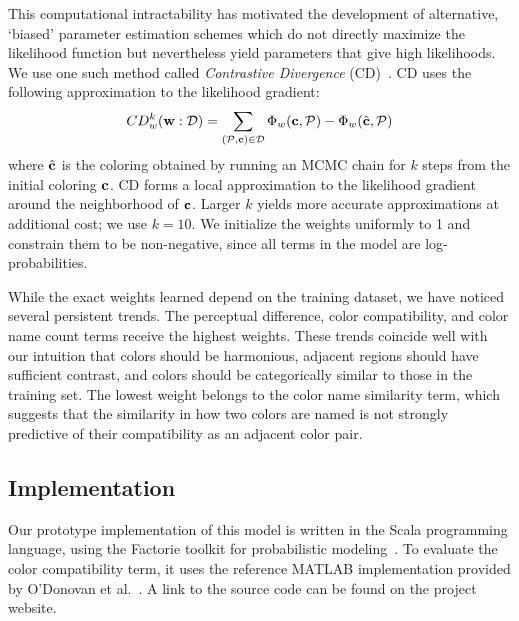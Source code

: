 This computational intractability has motivated the development of alternative, `biased' parameter estimation schemes which do not directly maximize the likelihood function but nevertheless yield parameters that give high likelihoods. We use one such method called \emph{Contrastive Divergence} (CD)~\cite{ContrastiveDivergence}. CD uses the following approximation to the likelihood gradient:
\begin{equation*}
CD^k_w(\mathbf{w} : \mathcal{D}) = 
	\sum_{(\mathcal{P}, \mathbf{c}) \in \mathcal{D}}
			\Phi_w(\mathbf{c}, \mathcal{P})
		 -\Phi_w(\hat{\mathbf{c}}, \mathcal{P})
\end{equation*}
where $\hat{\mathbf{c}}$ is the coloring obtained by running an MCMC chain for $k$ steps from the initial coloring $\mathbf{c}$. CD forms a local approximation to the likelihood gradient around the neighborhood of $\mathbf{c}$. Larger $k$ yields more accurate approximations at additional cost; we use $k = 10$. We initialize the weights uniformly to 1 and constrain them to be non-negative, since all terms in the model are log-probabilities.

While the exact weights learned depend on the training dataset, we have noticed several persistent trends.
The perceptual difference, color compatibility, and color name count terms receive the highest weights. These trends coincide well with our intuition that colors should be harmonious, adjacent regions should have sufficient contrast, and colors should be categorically similar to those in the training set.
The lowest weight belongs to the color name similarity term, which suggests that the similarity in how two colors are named is not strongly predictive of their compatibility as an adjacent color pair.

\subsection{Implementation}
\label{sec:implementation}

Our prototype implementation of this model is written in the Scala programming language, using the Factorie toolkit for probabilistic modeling~\cite{Factorie}. To evaluate the color compatibility term, it uses the reference MATLAB implementation provided by O'Donovan et al.~. A link to the source code can be found on the project website.